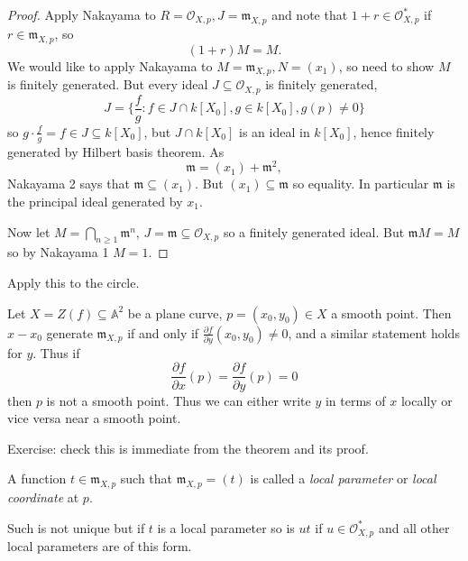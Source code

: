 \documentclass[a4paper]{article}
\renewcommand{\A}{\mathbb{A}}
\begin{document}
\begin{proof}
  Apply Nakayama to \(R = \mathcal O_{X, p}, J = \mathfrak m_{X, p}\) and note that \(1 + r \in \mathcal O_{X, p}^*\) if \(r \in \mathfrak m_{X, p}\), so
  \[
    (1 + r) M = M.
  \]
  We would like to apply Nakayama to \(M = \mathfrak m_{X, p}, N = (x_1)\), so need to show \(M\) is finitely generated. But every ideal \(J \subseteq \mathcal O_{X, p}\) is finitely generated,
  \[
    J = \{\frac{f}{g}: f \in J \cap k[X_0], g \in k[X_0], g(p) \neq 0\}
  \]
  so \(g \cdot \frac{f}{g} = f \in J \subseteq k[X_0]\), but \(J \cap k[X_0]\) is an ideal in \(k[X_0]\), hence finitely generated by Hilbert basis theorem. As
  \[
    \mathfrak m = (x_1) + \mathfrak m^2,
  \]
  Nakayama 2 says that \(\mathfrak m \subseteq (x_1)\). But \((x_1) \subseteq \mathfrak m\) so equality. In particular \(\mathfrak m\) is the principal ideal generated by \(x_1\).

  Now let \(M = \bigcap_{n \geq 1} \mathfrak m^n\), \(J = \mathfrak m \subseteq \mathcal O_{X, p}\) so a finitely generated ideal. But \(\mathfrak m M = M\) so by Nakayama 1 \(M = 1\).
\end{proof}

\begin{ex}
  Apply this to the circle.
\end{ex}

Let \(X = Z(f) \subseteq \A^2\) be a plane curve, \(p = (x_0, y_0) \in X\) a smooth point. Then \(x- x_0\) generate \(\mathfrak m_{X, p}\) if and only if \(\frac{\partial f}{\partial y}(x_0, y_0) \neq 0\), and a similar statement holds for \(y\). Thus if
\[
  \frac{\partial f}{\partial x}(p) = \frac{\partial f}{\partial y}(p) = 0
\]
then \(p\) is not a smooth point. Thus we can either write \(y\) in terms of \(x\) locally or vice versa near a smooth point.

Exercise: check this is immediate from the theorem and its proof.

\begin{definition}
  A function \(t \in \mathfrak m_{X, p}\) such that \(\mathfrak m_{X, p} = (t)\) is called a \emph{local parameter} or \emph{local coordinate} at \(p\).
\end{definition}

Such is not unique but if \(t\) is a local parameter so is \(ut\) if \(u \in \mathcal O_{X, p}^*\) and all other local parameters are of this form.
\end{document}
